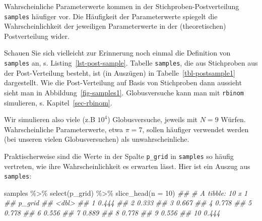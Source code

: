 \documentclass[
  a4paper,
  DIV=11]{scrreprt}
\newenvironment{Shaded}{\begin{snugshade}}{\end{snugshade}}
\newcommand{\AttributeTok}[1]{\textcolor[rgb]{0.40,0.45,0.13}{#1}}
\newcommand{\DecValTok}[1]{\textcolor[rgb]{0.68,0.00,0.00}{#1}}
\newcommand{\DocumentationTok}[1]{\textcolor[rgb]{0.37,0.37,0.37}{\textit{#1}}}
\newcommand{\FunctionTok}[1]{\textcolor[rgb]{0.28,0.35,0.67}{#1}}
\newcommand{\NormalTok}[1]{\textcolor[rgb]{0.00,0.23,0.31}{#1}}
\newcommand{\SpecialCharTok}[1]{\textcolor[rgb]{0.37,0.37,0.37}{#1}}
\theoremstyle{definition}
\theoremstyle{remark}
\begin{document}
\begin{tcolorbox}[enhanced jigsaw, title=\textcolor{quarto-callout-note-color}{\faInfo}\hspace{0.5em}{Hinweis}, bottomtitle=1mm, bottomrule=.15mm, titlerule=0mm, colbacktitle=quarto-callout-note-color!10!white, colframe=quarto-callout-note-color-frame, leftrule=.75mm, left=2mm, toprule=.15mm, colback=white, arc=.35mm, breakable, toptitle=1mm, opacityback=0, rightrule=.15mm, coltitle=black, opacitybacktitle=0.6]

Wahrscheinliche Parameterwerte kommen in der Stichproben-Postverteilung
\texttt{samples} häufiger vor. Die Häufigkeit der Parameterwerte
spiegelt die Wahrscheinlichkeit der jeweiligen Parameterwerte in der
(theoretischen) Postverteilung wider.

\end{tcolorbox}

Schauen Sie sich vielleicht zur Erinnerung noch einmal die Definition
von \texttt{samples} an, s. Listing~\ref{lst-post-sample}. Tabelle
\texttt{samples}, die aus Stichproben aus der Post-Verteilung besteht,
ist (in Auszügen) in Tabelle~\ref{tbl-postsample1} dargestellt. Wie die
Post-Verteilung auf Basis von Stichproben dann aussieht sieht man in
Abbildung~\ref{fig-samples1}. Globusversuche kann man mit
\texttt{rbinom} simulieren, s. Kapitel~\ref{sec-rbinom}.

Wir simulieren also viele (z.B \(10^4\)) Globusversuche, jeweils mit
\(N=9\) Würfen. Wahrscheinliche Parameterwerte, etwa \(\pi=7\), sollen
häufiger verwendet werden (bei unseren vielen Globusversuchen) als
unwahrscheinliche.

Praktischerweise sind die Werte in der Spalte \texttt{p\_grid} in
\texttt{samples} so häufig vertreten, wie ihre Wahrscheinlichkeit es
erwarten lässt. Hier ist ein Auszug aus \texttt{samples}:

\begin{Shaded}
\begin{Highlighting}[]
\NormalTok{samples }\SpecialCharTok{\%\textgreater{}\%} 
  \FunctionTok{select}\NormalTok{(p\_grid) }\SpecialCharTok{\%\textgreater{}\%} 
  \FunctionTok{slice\_head}\NormalTok{(}\AttributeTok{n =} \DecValTok{10}\NormalTok{)}
\DocumentationTok{\#\# \# A tibble: 10 x 1}
\DocumentationTok{\#\#    p\_grid}
\DocumentationTok{\#\#     \textless{}dbl\textgreater{}}
\DocumentationTok{\#\#  1  0.444}
\DocumentationTok{\#\#  2  0.333}
\DocumentationTok{\#\#  3  0.667}
\DocumentationTok{\#\#  4  0.778}
\DocumentationTok{\#\#  5  0.778}
\DocumentationTok{\#\#  6  0.556}
\DocumentationTok{\#\#  7  0.889}
\DocumentationTok{\#\#  8  0.778}
\DocumentationTok{\#\#  9  0.556}
\DocumentationTok{\#\# 10  0.444}
\end{Highlighting}
\end{Shaded}
\end{document}
